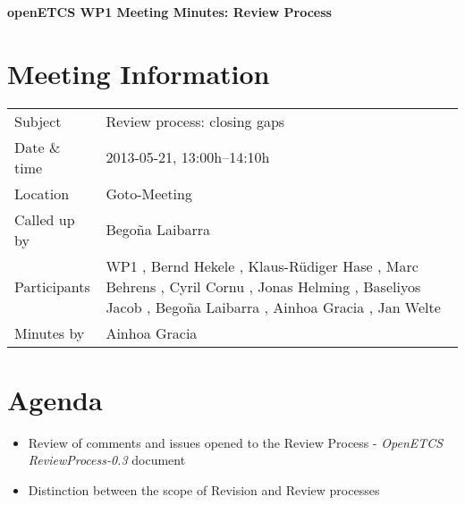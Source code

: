 \documentclass[a4paper, 11pt]{article}
\begin{document}
{\begin{center}\huge\bf openETCS WP1 Meeting Minutes: Review Process\end{center}}
\section{Meeting Information}

\renewcommand{\arraystretch}{1.5}
\begin{supertabular}{m{.2\textwidth}m{.8\textwidth}}
Subject & Review process: closing gaps\\
Date \& time & 2013-05-21, 13:00h--14:10h\\
Location & Goto-Meeting\\
Called up by & Bego\~na Laibarra\\
Participants & WP1
, Bernd Hekele
, Klaus-R\"udiger Hase
, Marc Behrens
, Cyril Cornu
, Jonas Helming
, Baseliyos Jacob
, Bego\~na Laibarra
, Ainhoa Gracia
, Jan Welte
\\

Minutes by & Ainhoa Gracia\\

\end{supertabular}
\renewcommand{\arraystretch}{1.0}


\section{{Agenda}}
\begin{itemize}
\item Review of comments and issues opened to the Review Process - {\it OpenETCS ReviewProcess-0.3} document
\item Distinction between the scope of Revision and Review processes
\end{itemize}
\end{document}
